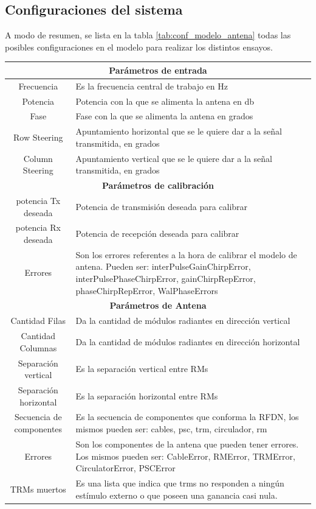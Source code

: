\subsection{Configuraciones del sistema}

A modo de resumen, se lista en la tabla \ref{tab:conf_modelo_antena} todas las posibles configuraciones en el modelo para 
realizar los distintos ensayos.

\begin{center}
  \footnotesize
  \centering
  \begin{longtable}{|c|p{9cm}|}
    \hline 
	\multicolumn{2}{|c|}{\textbf{Parámetros de entrada}} \\ 
	\hline
    Frecuencia		& Es la frecuencia central de trabajo en Hz \tabularnewline \hline 
    Potencia		& Potencia con la que se alimenta la antena en db \tabularnewline \hline 
    Fase			& Fase con la que se alimenta la antena en grados \tabularnewline \hline 
    Row Steering	& Apuntamiento horizontal que se le quiere dar a la señal transmitida, en grados  \tabularnewline \hline 
    Column Steering	& Apuntamiento vertical que se le quiere dar a la señal transmitida, en grados  \tabularnewline \hline 
	\multicolumn{2}{|c|}{\textbf{Parámetros de calibración}} \\ 
	\hline
	potencia Tx deseada	& Potencia de transmisión deseada para calibrar  \tabularnewline \hline 
	potencia Rx deseada	& Potencia de recepción deseada para calibrar  \tabularnewline \hline 
	Errores	& Son los errores referentes a la hora de calibrar el modelo de antena. Pueden ser: interPulseGainChirpError, 
	interPulsePhaseChirpError, gainChirpRepError, phaseChirpRepError, WalPhaseErrors  \tabularnewline \hline
	\multicolumn{2}{|c|}{\textbf{Parámetros de Antena}} \\ 
	\hline
	Cantidad Filas	& Da la cantidad de módulos radiantes en dirección vertical \tabularnewline \hline 
	Cantidad Columnas	& Da la cantidad de módulos radiantes en dirección horizontal \tabularnewline \hline 
	Separación vertical & Es la separación vertical entre RMs \tabularnewline \hline 
	Separación horizontal & Es la separación horizontal entre RMs \tabularnewline \hline 
	Secuencia de componentes & Es la secuencia de componentes que conforma la RFDN, los mismos pueden ser: cables, psc, trm, circulador, rm \tabularnewline \hline 
	Errores  & Son los componentes de la antena que pueden tener errores. Los mismos pueden ser: CableError, RMError, TRMError, CirculatorError, PSCError 
	\tabularnewline \hline 
	TRMs muertos & Es una lista que indica que trms no responden a ningún estímulo externo o que poseen una ganancia casi nula. \tabularnewline \hline 

\end{longtable}
\end{center}
